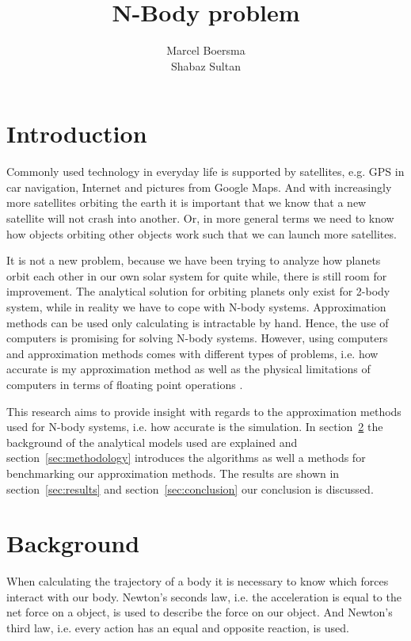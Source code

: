 \documentclass[11pt]{article} %
\title{N-Body problem}
\author{Marcel Boersma\\Shabaz Sultan}
\begin{document}
\maketitle

\section{Introduction}
Commonly used technology in everyday life is supported by satellites, e.g. GPS in car navigation, Internet and pictures from Google Maps. 
And with increasingly more satellites orbiting the earth it is important that we know that a new satellite will not crash into another.
Or, in more general terms we need to know how objects orbiting other objects work such that we can launch more satellites.

It is not a new problem, because we have been trying to analyze how planets orbit each other in our own solar system for quite while, there is still room for improvement.
The analytical solution for orbiting planets  only exist for 2-body system, while in reality we have to cope with N-body systems. Approximation methods can be used only calculating is intractable by hand. Hence, the use of computers is promising for solving N-body systems. However, using computers and approximation methods comes with different types of problems, i.e. how accurate is my approximation method as well as the physical limitations of computers in terms of floating point operations \cite{reviewpaper}.

This research aims to provide insight with regards to the approximation methods used for N-body systems, i.e. how accurate is the simulation. 
In section~\ref{sec:literature} the background of the analytical models used are explained and section~\ref{sec:methodology} introduces the algorithms as well a methods for benchmarking our approximation methods. The results are shown in section~\ref{sec:results} and section~\ref{sec:conclusion} our conclusion is discussed.

\section{Background}
\label{sec:literature}
When calculating the trajectory of a body it is necessary to know which forces interact with our body. Newton's seconds law, i.e. the acceleration is equal to the net force on a object, is used to describe the force on our object. And Newton's third law, i.e. every action has an equal and opposite reaction, is used. 
\end{document}
